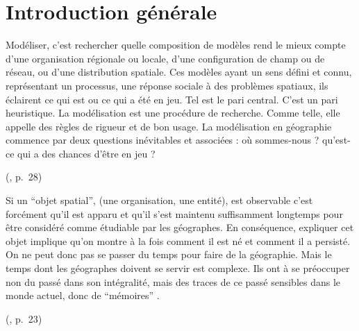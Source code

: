\setcounter{chapter}{0}
\graphicspath{{chap0-2-Intro/}}

\chapter*{Introduction générale}
\label{chap:intro}



\epigraph{
	\og 
	Modéliser, \textelp{} c'est rechercher quelle composition de modèles rend le mieux compte d'une organisation régionale ou locale, d'une configuration de champ ou de réseau, ou d'une distribution spatiale.
	\textelp{}
	Ces modèles ayant un sens défini et connu, représentant un processus, une réponse sociale à des problèmes spatiaux, ils éclairent ce qui est ou ce qui a été en jeu.
	Tel est le pari central. C'est un pari heuristique.
	La modélisation est une procédure de recherche. 
	Comme telle, elle appelle des règles de rigueur et de bon usage.
	La modélisation en géographie commence par deux questions inévitables et associées : où sommes-nous ? qu'est-ce qui a des chances d'être en jeu ?
	\fg{}
}{ (\citeyear{brunet2000modeles}, p.~28)}

\vspace*{-2.5em}\epigraph{
\og Si un ``objet spatial'', (une organisation, une entité), est observable c'est forcément qu'il est apparu et qu'il s'est maintenu suffisamment longtemps pour être considéré comme étudiable par les géographes.
En conséquence, expliquer cet objet implique qu'on montre à la fois comment il est né et comment il a persisté.
On ne peut donc pas se passer du temps pour faire de la géographie.
Mais le temps dont les géographes doivent se servir est complexe.
Ils ont à se préoccuper non du passé dans son intégralité, mais des traces de ce passé sensibles dans le monde actuel, donc de ``mémoires''
\fg{}.
}{ (\citeyear{durand-dastes_jamais_1999}, p.~23)}


